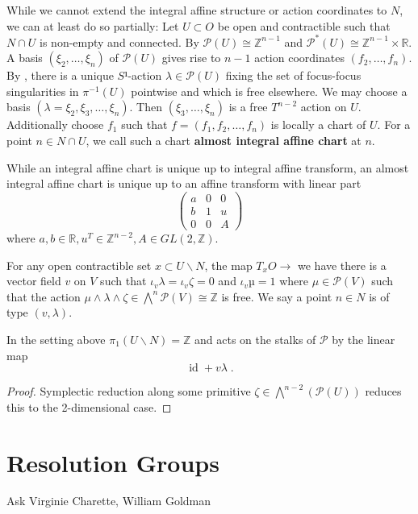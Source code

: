 \documentclass[12pt,a4paper,abstract=true,draft]{scrartcl}
\DeclareMathOperator{\id}{id}
\newcommand\mqty[1]{\begin{pmatrix}#1\end{pmatrix}}
\begin{document}
While we cannot extend the integral affine structure or action coordinates to $N$, we can at least do so partially:
Let $U ⊂ O$ be open and contractible such that $N ∩ U$ is non-empty and connected.
By \cite[Proposition 5.2 a)]{Zun96} $𝒫(U) ≅ ℤ^{n-1}$ and $𝒫^*(U) ≅ ℤ^{n-1} × ℝ$.
A basis $(ξ_2,…,ξ_n)$ of $𝒫(U)$ gives rise to $n-1$ action coordinates $(f_2,…,f_n)$.
By \cite[Proposition 5.2 b) and Proposition 5.4 a)]{Zun96}, there is a unique $S¹$-action $λ ∈ 𝒫(U)$ fixing the set of focus-focus singularities in $π^{-1}(U)$ pointwise and which is free elsewhere.
We may choose a basis $(λ=ξ_2,ξ_3,…,ξ_n)$.
Then $(ξ_3, … , ξ_n)$ is a free $T^{n-2}$ action on $U$.
Additionally choose $f_1$ such that $f = (f_1,f_2,…,f_n)$ is locally a chart of $U$.
For a point $n ∈ N ∩ U$, we call such a chart \textbf{almost integral affine chart} at $n$.

While an integral affine chart is unique up to integral affine transform, an almost integral affine chart is unique up to an affine transform with linear part
\[ \mqty{a & 0 & 0 \\ b & 1 & u \\ 0 & 0 & A} \]
where $a,b ∈ ℝ, u^T ∈ ℤ^{n-2}, A ∈ GL(2,ℤ)$.

For any open contractible set $x ⊂ U ∖ N$, the map $T_xO →$
we have there is a vector field $v$ on $V$ such that $ι_v λ = ι_v ζ = 0$ and $ι_v µ = 1$ where $μ ∈ 𝒫(V)$ such that the action $μ ∧ λ ∧ ζ ∈ ⋀^n 𝒫(V) ≅ ℤ$ is free.
We say a point $n ∈ N$ is of type $(v,λ)$.

\begin{lemma}[Monodromy]
  In the setting above $π_1(U ∖ N) = ℤ$ and acts on the stalks of $𝒫$ by the linear map \[\id + vλ \;.\]
\end{lemma}

\begin{proof}
  Symplectic reduction along some primitive $ζ ∈ ⋀^{n-2}(𝒫(U))$ reduces this to the 2-dimensional case.
\end{proof}

\begin{lemma}

\end{lemma}


\section{Resolution Groups}

Ask Virginie Charette, William Goldman
\end{document}
